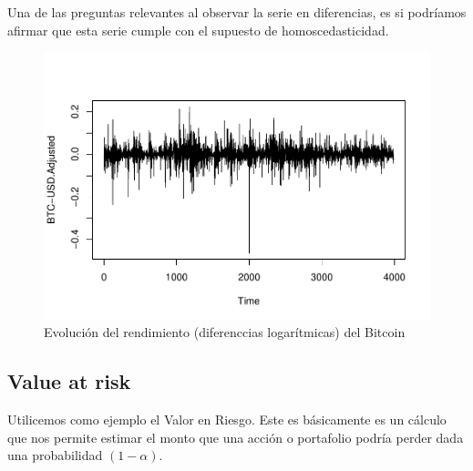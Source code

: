 \documentclass[
]{book}
\newenvironment{Shaded}{\begin{snugshade}}{\end{snugshade}}
\newcommand{\AttributeTok}[1]{\textcolor[rgb]{0.13,0.29,0.53}{#1}}
\newcommand{\DecValTok}[1]{\textcolor[rgb]{0.00,0.00,0.81}{#1}}
\newcommand{\FunctionTok}[1]{\textcolor[rgb]{0.13,0.29,0.53}{\textbf{#1}}}
\newcommand{\NormalTok}[1]{#1}
\newcommand{\OtherTok}[1]{\textcolor[rgb]{0.56,0.35,0.01}{#1}}
\newcommand{\SpecialCharTok}[1]{\textcolor[rgb]{0.81,0.36,0.00}{\textbf{#1}}}
\newcommand{\StringTok}[1]{\textcolor[rgb]{0.31,0.60,0.02}{#1}}
\begin{document}
Una de las preguntas relevantes al observar la serie en diferencias, es si podríamos afirmar que esta serie cumple con el supuesto de homoscedasticidad.

\begin{Shaded}
\end{Shaded}

\begin{figure}

{\centering \includegraphics{Notas-Series-Tiempo_files/figure-latex/fig102-1} 

}

\caption{Evolución del rendimiento (diferenccias logarítmicas) del Bitcoin}\label{fig:fig102}
\end{figure}

\hypertarget{value-at-risk}{%
\subsection{Value at risk}\label{value-at-risk}}

Utilicemos como ejemplo el Valor en Riesgo. Este es básicamente es un cálculo que nos permite estimar el monto que una acción o portafolio podría perder dada una probabilidad \((1-\alpha)\).
\end{document}
